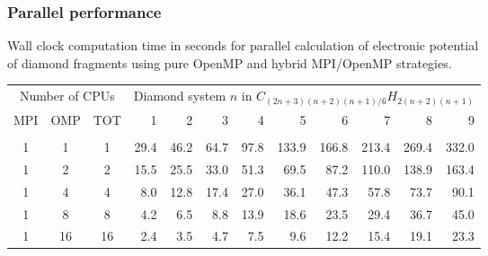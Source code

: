 \begin{frame}
    \frametitle{Parallel performance}
    \centering
    Wall clock computation time in seconds for parallel calculation of electronic potential\\
    of diamond fragments using pure OpenMP and hybrid MPI/OpenMP strategies.\\
    \begin{table}
    \tiny
    \begin{tabular}{cccrrrrrrrrr}
	\hline
	\hline                                                                           
	\multicolumn{3}{c}{Number of CPUs}&
	\multicolumn{9}{c}{Diamond system $n$ in $C_{(2n+3)(n+2)(n+1)/6}H_{2(n+2)(n+1)}$}\\
	MPI&OMP&TOT	&1	&2	&3	&4	&5	&6	&7	&8	&9	\\
	\hline
	   &   &   	&	&      	&	&	&	&	&	&	&	\\
	  1&  1&  1	& 29.4	& 46.2 	& 64.7 	& 97.8  &133.9  &166.8  &213.4  &269.4  &332.0  \\
	  1&  2&  2	& 15.5	& 25.5 	& 33.0 	& 51.3  & 69.5  & 87.2  &110.0  &138.9  &163.4  \\
	  1&  4&  4	&  8.0 	& 12.8 	& 17.4 	& 27.0  & 36.1  & 47.3  & 57.8  & 73.7  & 90.1  \\
	  1&  8&  8	&  4.2 	&  6.5 	&  8.8 	& 13.9  & 18.6  & 23.5  & 29.4  & 36.7  & 45.0  \\
	  1& 16& 16	&  2.4 	&  3.5 	&  4.7 	&  7.5  &  9.6  & 12.2  & 15.4  & 19.1  & 23.3  \\

\end{tabular}
\end{table}
\end{frame}
